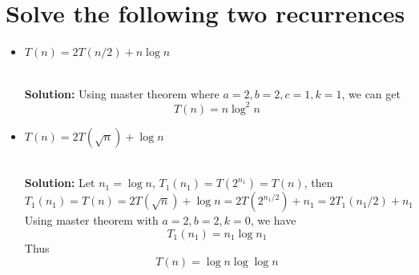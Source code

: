 \section{Solve the following two recurrences}
\begin{itemize}
\item $T(n) = 2T(n/2) + n\log n$

\ \\{\bf Solution:} Using master theorem where $a=2,b=2,c=1,k=1$, we can get
\[
T(n) = n\log^2 n
\]
\item $T(n) = 2T(\sqrt{n}) + \log n$

\ \\{\bf Solution:} Let $n_1=\log n$, $T_1(n_1)=T(2^{n_1})=T(n)$, then 
\[
T_1(n_1)=T(n)=2T(\sqrt{n})+\log n = 2 T(2^{n_1/2}) + n_1 = 2 T_1(n_1/2) + n_1
\]
Using master theorem with $a=2,b=2,k=0$, we have
\[
T_1(n_1) = n_1\log n_1
\]
Thus
\[
T(n) = \log n \log\log n
\]
\end{itemize}

